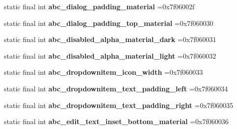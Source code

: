 \begin{DoxyCompactItemize}
\mbox{\label{classproject4_1_1xaria_1_1R_1_1dimen_a57d0aa045f321c65c1f0d93a357f2e3b}} 
static final int {\bfseries abc\+\_\+dialog\+\_\+padding\+\_\+material} =0x7f06002f
\item 
\mbox{\label{classproject4_1_1xaria_1_1R_1_1dimen_a5c5d1e5338390281d08f24d14e9087b0}} 
static final int {\bfseries abc\+\_\+dialog\+\_\+padding\+\_\+top\+\_\+material} =0x7f060030
\item 
\mbox{\label{classproject4_1_1xaria_1_1R_1_1dimen_a2d294f0dc87e95f7704b28ccdb8b8ce9}} 
static final int {\bfseries abc\+\_\+disabled\+\_\+alpha\+\_\+material\+\_\+dark} =0x7f060031
\item 
\mbox{\label{classproject4_1_1xaria_1_1R_1_1dimen_a9f56a370879b887fea13e58c79f033d8}} 
static final int {\bfseries abc\+\_\+disabled\+\_\+alpha\+\_\+material\+\_\+light} =0x7f060032
\item 
\mbox{\label{classproject4_1_1xaria_1_1R_1_1dimen_a2dfa15e5e21b349dc911405b4e9669fd}} 
static final int {\bfseries abc\+\_\+dropdownitem\+\_\+icon\+\_\+width} =0x7f060033
\item 
\mbox{\label{classproject4_1_1xaria_1_1R_1_1dimen_afcbaf39b0f6c748c4ff14d94f27250cb}} 
static final int {\bfseries abc\+\_\+dropdownitem\+\_\+text\+\_\+padding\+\_\+left} =0x7f060034
\item 
\mbox{\label{classproject4_1_1xaria_1_1R_1_1dimen_a03d46caaf4f94a1e67536b240f601655}} 
static final int {\bfseries abc\+\_\+dropdownitem\+\_\+text\+\_\+padding\+\_\+right} =0x7f060035
\item 
\mbox{\label{classproject4_1_1xaria_1_1R_1_1dimen_a336bc497fc9ba89ca175df888a4a7c80}} 
static final int {\bfseries abc\+\_\+edit\+\_\+text\+\_\+inset\+\_\+bottom\+\_\+material} =0x7f060036
\item 
\mbox{\label{classproject4_1_1xaria_1_1R_1_1dimen_a4a5fefd7d3e764d44c5a7e6a0e66eb56}} 

\end{DoxyCompactItemize}

